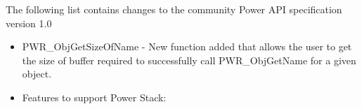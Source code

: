 The following list contains changes to the community Power API specification version 1.0
\begin{itemize}
  \item{PWR_ObjGetSizeOfName - New function added that allows the user to get the size of buffer required to successfully call PWR_ObjGetName for a given object.}
  \item{Features to support Power Stack:}
\end{itemize}



